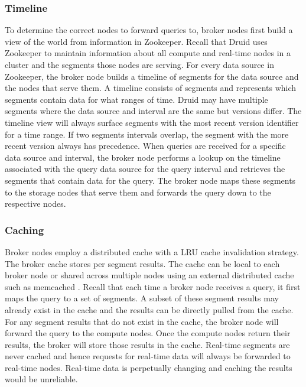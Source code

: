 \documentclass{vldb}
\begin{document}
\subsubsection{Timeline}
To determine the correct nodes to forward queries to, broker nodes
first build a view of the world from information in Zookeeper. Recall
that Druid uses Zookeeper to maintain information about all compute
and real-time nodes in a cluster and the segments those nodes are
serving. For every data source in Zookeeper, the broker node builds a
timeline of segments for the data source and the nodes that serve them. A timeline
consists of segments and represents which segments contain data for
what ranges of time. Druid may have multiple segments where the data
source and interval are the same but versions differ. The timeline
view will always surface segments with the most recent version
identifier for a time range. If two segments intervals overlap, the segment with the more recent
version always has precedence. When queries are received for a specific
data source and interval, the broker node performs a lookup on the
timeline associated with the query data source for the query interval
and retrieves the segments that contain data for the query. The broker
node maps these segments to the storage nodes that serve them and
forwards the query down to the respective nodes.


\subsubsection{Caching}
\label{sec:caching}
Broker nodes employ a distributed cache with a LRU \cite{o1993lru,
kim2001lrfu} cache invalidation strategy. The broker cache stores
per segment results. The cache can be local to each broker node or
shared across multiple nodes using an external distributed cache
such as memcached \cite{fitzpatrick2004distributed}. Recall that each time a broker node receives a
query, it first maps the query to a set of segments. A subset of
these segment results may already exist in the cache and the results
can be directly pulled from the cache. For any segment results that
do not exist in the cache, the broker node will forward the query
to the compute nodes. Once the compute nodes return their results,
the broker will store those results in the cache. Real-time segments
are never cached and hence requests for real-time data will always
be forwarded to real-time nodes. Real-time data is perpetually
changing and caching the results would be unreliable.
\end{document}
